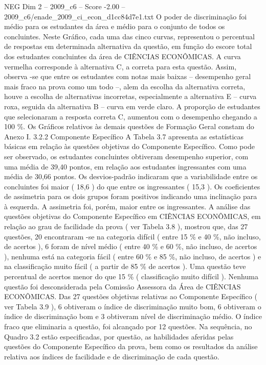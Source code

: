 \begin{textsample}{NEG Dim 2 – 2009\_c6 – Score -2.00 – 2009\_c6/enade\_2009\_ci\_econ\_d1cc84d7e1.txt}
O poder de discriminação foi médio para os estudantes da área e médio para o conjunto de todos os concluintes.
Neste Gráfico, cada uma das cinco curvas, representou o percentual de respostas em determinada alternativa da questão, em função do escore total dos estudantes concluintes da área de CIÊNCIAS ECONÔMICAS.
A curva vermelha corresponde à alternativa C, a correta para esta questão.
Assim, observa -se que entre os estudantes com notas mais baixas – desempenho geral mais fraco na prova como um todo –, alem da escolha da alternativa correta, houve a escolha de alternativas incorretas, especialmente a alternativa E – curva roxa, seguida da alternativa B – curva em verde claro.
A proporção de estudantes que selecionaram a resposta correta C, aumentou com o desempenho chegando a 100 \%.
Os Gráficos relativos às demais questões de Formação Geral constam do Anexo I. 3.2.2 Componente Específico A Tabela 3.7 apresenta as estatísticas básicas em relação às questões objetivas do Componente Específico.
Como pode ser observado, os estudantes concluintes obtiveram desempenho superior, com uma média de 39,40 pontos, em relação aos estudantes ingressantes com uma média de 30,66 pontos.
Os desvios-padrão indicaram que a variabilidade entre os concluintes foi maior ( 18,6 ) do que entre os ingressantes ( 15,3 ).
Os coeficientes de assimetria para os dois grupos foram positivos indicando uma inclinação para à esquerda.
A assimetria foi, porém, maior entre os ingressantes.
A análise das questões objetivas do Componente Específico em CIÊNCIAS ECONÔMICAS, em relação ao grau de facilidade da prova ( ver Tabela 3.8 ), mostrou que, das 27 questões, 20 encontraram -se na categoria difícil ( entre 15 \% e 40 \%, não incluso, de acertos ), 6 foram de nível médio ( entre 40 \% e 60 \%, não incluso, de acertos ), nenhuma está na categoria fácil ( entre 60 \% e 85 \%, não incluso, de acertos ) e na classificação muito fácil ( a partir de 85 \% de acertos ).
Uma questão teve percentual de acertos menor do que 15 \% ( classificação muito difícil ).
Nenhuma questão foi desconsiderada pela Comissão Assessora da Área de CIÊNCIAS ECONÔMICAS.
Das 27 questões objetivas relativas ao Componente Específico ( ver Tabela 3.9 ), 6 obtiveram o índice de discriminação muito bom, 6 obtiveram o índice de discriminação bom e 3 obtiveram nível de discriminação médio.
O índice fraco que eliminaria a questão, foi alcançado por 12 questões.
Na sequência, no Quadro 3.2 estão especificadas, por questão, as habilidades aferidas pelas questões do Componente Específico da prova, bem como os resultados da análise relativa aos índices de facilidade e de discriminação de cada questão.

\end{textsample}
